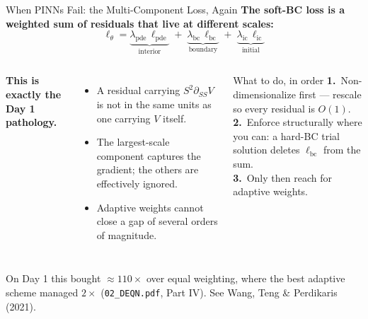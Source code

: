 \documentclass[aspectratio=169,11pt]{beamer}
\newcommand{\emphc}[1]{\textcolor{harvardcrimson}{#1}}
\begin{document}
\begin{frame}{When PINNs Fail: the Multi-Component Loss, Again}
\textbf{The soft-BC loss is a weighted sum of residuals that live at different scales:}
\[
\ell_\theta = \underbrace{\lambda_{\text{pde}}\,\ell_{\text{pde}}}_{\text{interior}}
\;+\; \underbrace{\lambda_{\text{bc}}\,\ell_{\text{bc}}}_{\text{boundary}}
\;+\; \underbrace{\lambda_{\text{ic}}\,\ell_{\text{ic}}}_{\text{initial}}
\]

\vspace{0.5em}
\begin{columns}[T]
\textbf{This is exactly the Day 1 pathology.}
\begin{itemize}\setlength\itemsep{2pt}
    \item A residual carrying $S^2\partial_{SS}V$ is not in the same units as one carrying $V$ itself.
    \item The largest-scale component captures the gradient; the others are effectively ignored.
    \item Adaptive weights cannot close a gap of several orders of magnitude.
\end{itemize}

\begin{block}{What to do, in order}
\small
\textbf{1.}~\emphc{Non-dimensionalize} first --- rescale so every residual is $O(1)$.\\[3pt]
\textbf{2.}~Enforce \emphc{structurally} where you can: a hard-BC trial solution deletes $\ell_{\text{bc}}$ from the sum.\\[3pt]
\textbf{3.}~Only then reach for adaptive weights.
\end{block}
\end{columns}

\vspace{0.3em}
{\footnotesize On Day 1 this bought $\approx 110\times$ over equal weighting, where the best adaptive scheme managed $2\times$ (\texttt{02\_DEQN.pdf}, Part IV). See Wang, Teng \& Perdikaris (2021).}
\end{frame}
\end{document}
